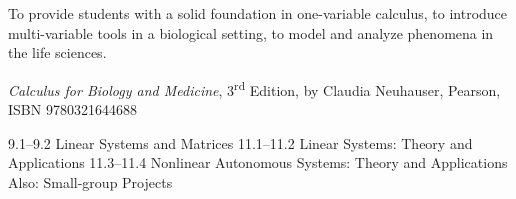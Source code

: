 \documentclass{osucourse}
\begin{document}
\CatalogDescription
\PrerequisitesAndExclusions

\begin{Purpose}
To provide students with a solid foundation in one-variable calculus, to introduce multi-variable tools in a biological setting, to model and analyze phenomena in the life sciences.
\end{Purpose}

\begin{Text}
\emph{Calculus for Biology and Medicine}, 3\textsuperscript{rd} Edition, by Claudia Neuhauser, Pearson, ISBN 9780321644688
\end{Text}

\begin{TopicsOutline}
9.1--9.2   Linear Systems and Matrices
11.1--11.2 Linear Systems: Theory and Applications
11.3--11.4 Nonlinear Autonomous Systems: Theory and Applications
Also:     Small-group Projects
\end{TopicsOutline}
\end{document}
